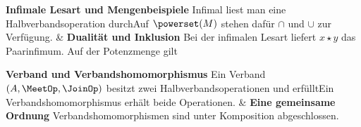 \begin{BandUebersicht}
\textbf{Infimale Lesart und Mengenbeispiele}
Infimal liest man eine Halbverbandsoperation durchAuf \(\powerset(M)\) stehen dafür \(\cap\) und \(\cup\) zur Verfügung.
&
\textbf{Dualität und Inklusion}
Bei der infimalen Lesart liefert \(x\star y\) das Paarinfimum.
Auf der Potenzmenge gilt
 \\
\addlinespace[.8ex]

\textbf{Verband und Verbandshomomorphismus}
Ein Verband \((A,\MeetOp,\JoinOp)\) besitzt zwei
Halbverbandsoperationen und erfülltEin Verbandshomomorphismus erhält beide Operationen.
&
\textbf{Eine gemeinsame Ordnung}
Verbandshomomorphismen sind unter Komposition abgeschlossen.
 \\
\addlinespace[.8ex]


\end{BandUebersicht}
